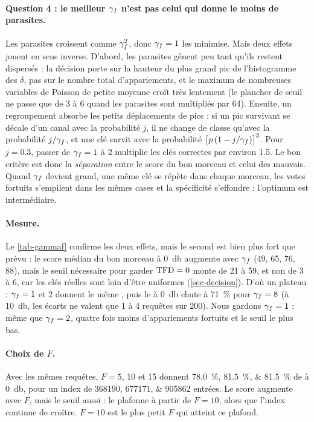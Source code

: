 \paragraph{Question 4 : le meilleur $\gamma_f$ n'est pas celui qui donne le moins de parasites.}
Les parasites croissent comme $\gamma_f^2$, donc $\gamma_f = 1$ les minimise. Mais deux effets jouent
en sens inverse. D'abord, les parasites gênent peu tant qu'ils restent dispersés : la
décision porte sur la hauteur du plus grand pic de l'histogramme des $\delta$, pas sur le
nombre total d'appariements, et le maximum de nombreuses variables de Poisson de petite
moyenne croît très lentement (le plancher de seuil ne passe que de 3 à 6 quand les
parasites sont multipliés par 64). Ensuite, un regroupement absorbe les petits déplacements
de pics : si un pic survivant se décale d'un canal avec la probabilité $j$, il ne change de
classe qu'avec la probabilité $j/\gamma_f$, et une clé survit avec la probabilité
$\bigl[p\,(1 - j/\gamma_f)\bigr]^2$. Pour $j = \num{0.3}$, passer de $\gamma_f = 1$ à 2 multiplie les clés
correctes par environ \num{1.5}. Le bon critère est donc la \emph{séparation} entre le score
du bon morceau et celui des mauvais. Quand $\gamma_f$ devient grand, une même clé se répète dans
chaque morceau, les votes fortuits s'empilent dans les mêmes cases et la spécificité
s'effondre : l'optimum est intermédiaire.

\paragraph{Mesure.} Le \cref{tab-gammaf} confirme les deux effets, mais le second est bien
plus fort que prévu : le score médian du bon morceau à \qty{0}{\decibel} augmente avec $\gamma_f$
(49, 65, 76, 88), mais le seuil nécessaire pour garder $\mathrm{TFD} = 0$ monte de 21 à 59, et non de
3 à 6, car les clés réelles sont loin d'être uniformes (\cref{sec-decision}). D'où un
plateau : $\gamma_f = 1$ et 2 donnent le même \TBD{}, puis le \TBD{} à \qty{0}{\decibel} chute à
\qty{71}{\percent} pour $\gamma_f = 8$ (à \qty{10}{\decibel}, les écarts ne valent que 1 à 4
requêtes sur 200). Nous gardons $\gamma_f = 1$ : même \TBD{} que $\gamma_f = 2$, quatre fois moins
d'appariements fortuits et le seuil le plus bas.

\paragraph{Choix de $F$.} Avec les mêmes requêtes, $F = 5$, 10 et 15 donnent
\qtylist{78.0;81.5;81.5}{\percent} de \TBD{} à \qty{0}{\decibel}, pour un index de
\numlist{368190;677171;905862} entrées. Le score augmente avec $F$, mais le seuil aussi :
le \TBD{} plafonne à partir de $F = 10$, alors que l'index continue de croître. $F = 10$ est
le plus petit $F$ qui atteint ce plafond.

